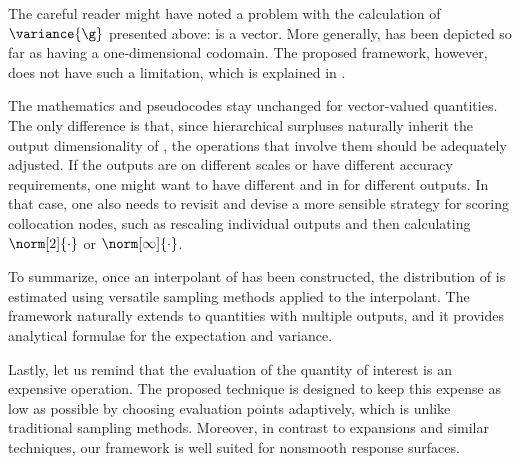 The careful reader might have noted a problem with the calculation of
$\variance{\g}$ presented above: \h is a vector. More generally, \g has been
depicted so far as having a one-dimensional codomain. The proposed framework,
however, does not have such a limitation, which is explained in
.

\begin{remark} 
The mathematics and pseudocodes stay unchanged for vector-valued quantities. The
only difference is that, since hierarchical surpluses naturally inherit the
output dimensionality of \g, the operations that involve them should be
adequately adjusted. If the outputs are on different scales or have different
accuracy requirements, one might want to have different  and 
in  for different outputs. In that case, one also needs to
revisit  and devise a more sensible strategy for scoring
collocation nodes, such as rescaling individual outputs and then calculating
$\norm[2]{\cdot}$ or $\norm[\infty]{\cdot}$.
\end{remark}

To summarize, once an interpolant of \g has been constructed, the distribution
of \g is estimated using versatile sampling methods applied to the interpolant.
The framework naturally extends to quantities with multiple outputs, and it
provides analytical formulae for the expectation and variance.

Lastly, let us remind that the evaluation of the quantity of interest is an
expensive operation. The proposed technique is designed to keep this expense as
low as possible by choosing evaluation points adaptively, which is unlike
traditional sampling methods. Moreover, in contrast to  expansions and
similar techniques, our framework is well suited for nonsmooth response
surfaces.
